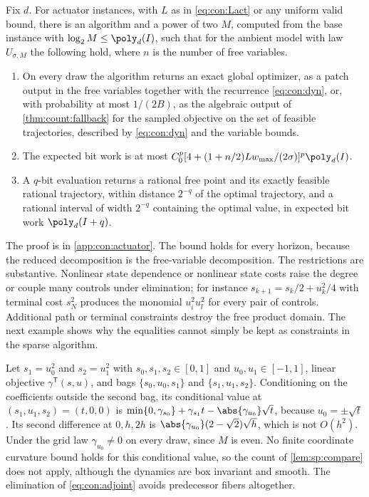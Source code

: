 \begin{theorem}\label{thm:con:actuator}
Fix $d$. For actuator instances, with $L$ as in \eqref{eq:con:Lact} or any
uniform valid bound, there is an algorithm and a power of two $M$, computed
from the base instance with $\log_2M\le\poly_d(I)$, such that for the ambient
model with law $U_{\sigma,M}$ the following hold, where $n$ is the number of
free variables.
\begin{enumerate}[label=(\roman*)]
\item On every draw the algorithm returns an exact global optimizer, as a
patch output in the free variables together with the recurrence
\eqref{eq:con:dyn}, or, with probability at most $1/(2B)$, as the algebraic
output of \cref{thm:count:fallback} for the sampled objective on the set of
feasible trajectories, described by \eqref{eq:con:dyn} and the variable
bounds.
\item The expected bit work is at most
$C_0^p[4+(1+n/2)Lw_{\max}/(2\sigma)]^p\poly_d(I)$.
\item A $q$-bit evaluation returns a rational free point and its exactly
feasible rational trajectory, within distance $2^{-q}$ of the optimal
trajectory, and a rational interval of width $2^{-q}$ containing the optimal
value, in expected bit work $\poly_d(I+q)$.
\end{enumerate}
\end{theorem}

The proof is in \cref{app:con:actuator}. The bound holds for every horizon,
because the reduced decomposition is the free-variable decomposition. The
restrictions are substantive. Nonlinear state dependence or nonlinear state
costs raise the degree or couple many controls under elimination; for
instance $s_{k+1}=s_k/2+u_k^2/4$ with terminal cost $s_N^2$ produces the
monomial $u_i^2u_l^2$ for every pair of controls. Additional path or terminal
constraints destroy the free product domain. The next example shows why the
equalities cannot simply be kept as constraints in the sparse algorithm.

\begin{example}\label{ex:con:dyn}
Let $s_1=u_0^2$ and $s_2=u_1^2$ with $s_0,s_1,s_2\in[0,1]$ and
$u_0,u_1\in[-1,1]$, linear objective $\gamma^{\mathsf T}(s,u)$, and bags
$\{s_0,u_0,s_1\}$ and $\{s_1,u_1,s_2\}$. Conditioning on the coefficients
outside the second bag, its conditional value at $(s_1,u_1,s_2)=(t,0,0)$ is
$\min\{0,\gamma_{s_0}\}+\gamma_{s_1}t-\abs{\gamma_{u_0}}\sqrt t$, because
$u_0=\pm\sqrt t$. Its second difference at $0,h,2h$ is
$\abs{\gamma_{u_0}}(2-\sqrt2)\sqrt h$, which is not $O(h^2)$. Under the grid
law $\gamma_{u_0}\ne0$ on every draw, since $M$ is even. No finite
coordinate curvature bound holds for this conditional value, so the count of
\cref{lem:sp:compare} does not apply, although the dynamics are box invariant
and smooth. The elimination of \eqref{eq:con:adjoint} avoids predecessor
fibers altogether.
\end{example}

